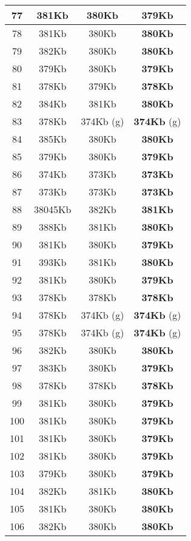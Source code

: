 \begin{table}[H]
\begin{minipage}{5cm}
{\begin{tabular}{|c|c|c|c|}
\hline
77 & 381Kb & 380Kb & \textbf{379Kb} \\
\hline
78 & 381Kb & 380Kb & \textbf{380Kb} \\
\hline
79 & 382Kb & 380Kb & \textbf{380Kb} \\
\hline
80 & 379Kb & 380Kb & \textbf{379Kb} \\
\hline
81 & 378Kb & 379Kb & \textbf{378Kb} \\
\hline
82 & 384Kb & 381Kb & \textbf{380Kb} \\
\hline
83 & 378Kb & 374Kb (g) & \textbf{374Kb} (g) \\
\hline
84 & 385Kb & 380Kb & \textbf{380Kb} \\
\hline
85 & 379Kb & 380Kb & \textbf{379Kb} \\
\hline
86 & 374Kb & 373Kb & \textbf{373Kb} \\
\hline
87 & 373Kb & 373Kb & \textbf{373Kb} \\
\hline
88 & 38045Kb & 382Kb & \textbf{381Kb} \\
\hline
89 & 388Kb & 381Kb & \textbf{380Kb} \\
\hline
90 & 381Kb & 380Kb & \textbf{379Kb} \\
\hline
91 & 393Kb & 381Kb & \textbf{380Kb} \\
\hline
92 & 381Kb & 380Kb & \textbf{379Kb} \\
\hline
93 & 378Kb & 378Kb & \textbf{378Kb} \\
\hline
94 & 378Kb & 374Kb (g) & \textbf{374Kb} (g) \\
\hline
95 & 378Kb & 374Kb (g) & \textbf{374Kb} (g) \\
\hline
96 & 382Kb & 380Kb & \textbf{380Kb} \\
\hline
97 & 383Kb & 380Kb & \textbf{379Kb} \\
\hline
98 & 378Kb & 378Kb & \textbf{378Kb} \\
\hline
99 & 381Kb & 380Kb & \textbf{379Kb} \\
\hline
100 & 381Kb & 380Kb & \textbf{379Kb} \\
\hline
101 & 381Kb & 380Kb & \textbf{379Kb} \\
\hline
102 & 381Kb & 380Kb & \textbf{379Kb} \\
\hline
103 & 379Kb & 380Kb & \textbf{379Kb} \\
\hline
104 & 382Kb & 381Kb & \textbf{380Kb} \\
\hline
105 & 381Kb & 380Kb & \textbf{380Kb} \\
\hline
106 & 382Kb & 380Kb & \textbf{380Kb} \\

\end{tabular}}
\end{minipage}
\end{table}
